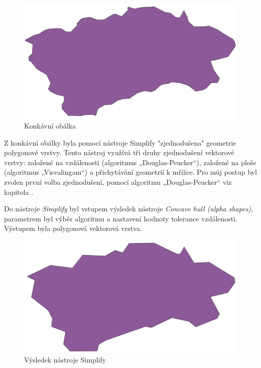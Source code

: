 \begin{figure}[H] \centering
    \includegraphics[width=400pt]{./pictures/concaveHull-P0B.png}
    \caption[Konkávní obálka]{Konkávní obálka}
	\label{fig:concaveHull-P0B}              
\end{figure} 

Z konkávní obálky byla pomocí nástroje Simplify "zjednodušena" geometrie polygonové vrstvy. Tento nástroj
využívá tři druhy zjednodušení vektorové vrstvy: založené na vzdálenosti (algoritmus „Douglas-Peucker“),
založené na ploše (algoritmus „Visvalingam“) a přichytávání geometrií k mřížce.
Pro můj postup byl zvolen první volba zjednodušení, pomocí algoritmu „Douglas-Peucker“ viz kapitola \label{generalizace_zjemneni}.

Do nástroje \textit{Simplify} byl vstupem výsledek nástroje \textit{Concave hull (alpha shapes)}, parametrem byl výběr algoritmu 
a nastavení hodnoty tolerance vzdálenosti. Výstupem byla polygonová vektorová vrstva.

\begin{figure}[H] \centering
    \includegraphics[width=400pt]{./pictures/simplify-P0B.png}
    \caption[Výsledek nástroje Simplify]{Výsledek nástroje Simplify}
	\label{fig:simplify-P0B}                                
\end{figure}

